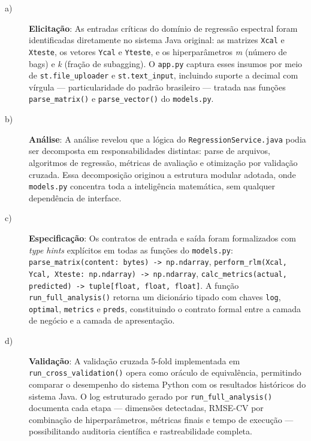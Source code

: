 \begin{description}

\item[a)] \textbf{Elicitação}: As entradas críticas do domínio de regressão espectral foram
identificadas diretamente no sistema Java original: as matrizes \texttt{Xcal} e
\texttt{Xteste}, os vetores \texttt{Ycal} e \texttt{Yteste}, e os hiperparâmetros
\textit{m} (número de bags) e \textit{k} (fração de subagging). O \texttt{app.py}
captura esses insumos por meio de \texttt{st.file\_uploader} e \texttt{st.text\_input},
incluindo suporte a decimal com vírgula — particularidade do padrão brasileiro — tratada
nas funções \texttt{parse\_matrix()} e \texttt{parse\_vector()} do \texttt{models.py}.

\item[b)] \textbf{Análise}: A análise revelou que a lógica do \texttt{RegressionService.java}
podia ser decomposta em responsabilidades distintas: parse de arquivos, algoritmos de
regressão, métricas de avaliação e otimização por validação cruzada. Essa decomposição
originou a estrutura modular adotada, onde \texttt{models.py} concentra toda a
inteligência matemática, sem qualquer dependência de interface.

\item[c)] \textbf{Especificação}: Os contratos de entrada e saída foram formalizados com
\textit{type hints} explícitos em todas as funções do \texttt{models.py}:
\texttt{parse\_matrix(content: bytes) -> np.ndarray},
\texttt{perform\_rlm(Xcal, Ycal, Xteste: np.ndarray) -> np.ndarray},
\texttt{calc\_metrics(actual, predicted) -> tuple[float, float, float]}.
A função \texttt{run\_full\_analysis()} retorna um dicionário tipado com chaves
\texttt{log}, \texttt{optimal}, \texttt{metrics} e \texttt{preds}, constituindo o
contrato formal entre a camada de negócio e a camada de apresentação.

\item[d)] \textbf{Validação}: A validação cruzada 5-fold implementada em
\texttt{run\_cross\_validation()} opera como oráculo de equivalência, permitindo comparar
o desempenho do sistema Python com os resultados históricos do sistema Java. O log
estruturado gerado por \texttt{run\_full\_analysis()} documenta cada etapa — dimensões
detectadas, RMSE-CV por combinação de hiperparâmetros, métricas finais e tempo de
execução — possibilitando auditoria científica e rastreabilidade completa.

\end{description}

